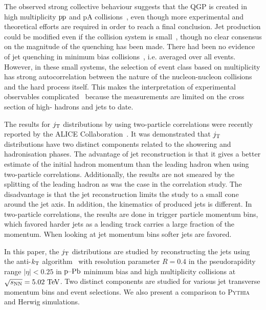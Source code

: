 The observed strong collective behaviour suggests that the QGP is created in high multiplicity $\mbox{p\kern-0.05em p}$ and pA collisions~\cite{Abelev:2012ola,Aad:2012gla,Chatrchyan:2013nka,Khachatryan:2010gv,Khachatryan:2016txc,Aidala:2016vgl}, even though more experimental and theoretical efforts are required in order to reach a final conclusion. Jet production could be modified even if the collision system is small~\cite{Zhang:2013oca,Park:2016jap,TYWONIUK201485}, though no clear consensus on the magnitude of the quenching has been made. There had been no evidence of jet quenching in minimum bias collisions~\cite{Khachatryan:2016odn,ALICEjt}, i.e. averaged over all events.  However, in these small systems, the selection of event class based on multiplicity has strong autocorrelation between the nature of the nucleon-nucleon collisions and the hard process itself. This makes the interpretation of experimental observables complicated~\cite{Adam:2014qja, Adam:2016jfp,Nagle:2018nvi} because the measurements are limited on the cross section of high-\pt{} hadrons and jets to date.

The results for $j_{\rm T}$ distributions by using two-particle correlations were recently reported by the ALICE Collaboration~\cite{ALICEjt}.
It was demonstrated that $j_{\rm T}$ distributions have two distinct components related to the showering and hadronisation phases.
The advantage of jet reconstruction is that it gives a better estimate of the initial hadron momentum than the leading hadron when using two-particle correlations. Additionally, the results are not smeared by the splitting of the leading hadron as was the case in the correlation study. The disadvantage is that the jet reconstruction limits the study to a small cone around the jet axis. In addition, the kinematics of produced jets is different. In two-particle correlations, the results are done in trigger particle momentum bins, which favored harder jets as a leading track carries a large fraction of the momentum. When looking at jet momentum bins softer jets are favored.

In this paper, the $j_{\rm T}$ distributions are studied by reconstructing the jets using the anti-$k_{\rm T}$ algorithm~\cite{antikt} with resolution parameter $R=0.4$ in the pseudorapidity range $|\eta|<0.25$ in $\mbox{p--Pb}$ minimum bias and high multiplicity collisions at $\sqrt{s_{\mathrm{NN}}} = 5.02~\mathrm{TeV}$.
Two distinct components are studied for various jet transverse momentum bins and event selections.
We also present a comparison to \textsc{Pythia} and Herwig simulations.

